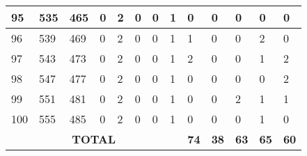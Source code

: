 \begin{sidewaystable}[!h]
\begin{tabular}{|l|l|l|l|l|l|l|l|l|l|l|l|l|}
			95 & 535 & 465 & 0 & 2 & 0 & 0 & 1 & 0 & 0 & 0 & 0 & 0 \\ \hline
			96 & 539 & 469 & 0 & 2 & 0 & 0 & 1 & 1 & 0 & 0 & 2 & 0 \\ \hline
			97 & 543 & 473 & 0 & 2 & 0 & 0 & 1 & 2 & 0 & 0 & 1 & 2 \\ \hline
			98 & 547 & 477 & 0 & 2 & 0 & 0 & 1 & 0 & 0 & 0 & 0 & 2 \\ \hline
			99 & 551 & 481 & 0 & 2 & 0 & 0 & 1 & 0 & 0 & 2 & 1 & 1 \\ \hline
			100 & 555 & 485 & 0 & 2 & 0 & 0 & 1 & 0 & 0 & 0 & 1 & 0 \\ \hline
			\multicolumn{8}{|c|}{\textbf{TOTAL}} & \textbf{74} & \textbf{38} & \textbf{63} & \textbf{65} & \textbf{60} \\ \hline
		\end{tabular}
\end{sidewaystable}
\clearpage

